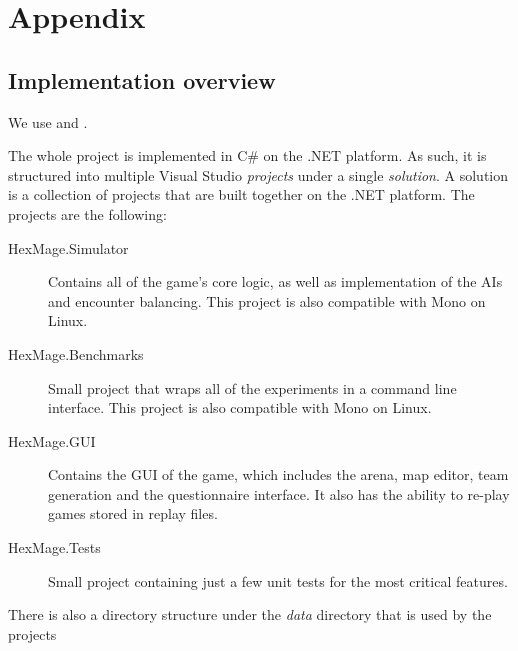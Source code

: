 \chapter{Appendix}
\label{appendix}

\section{Implementation overview}

We use \cite{libgdx} and \cite{json}.

The whole project is implemented in C\# on the .NET platform. As such, it is structured
into multiple Visual Studio \emph{projects} under a single \emph{solution}. A solution is a collection
of projects that are built together on the .NET platform. The projects are
the following:


\begin{description}
	\item[HexMage.Simulator] Contains all of the game's core logic, as well as implementation of the AIs
		and encounter balancing. This project is also compatible with Mono on Linux.
	\item[HexMage.Benchmarks] Small project that wraps all of the experiments in a command line interface.
		This project is also compatible with Mono on Linux.
	\item[HexMage.GUI] Contains the GUI of the game, which includes the arena, map editor, team generation
		and the questionnaire interface. It also has the ability to re-play games stored in replay files.
	\item[HexMage.Tests] Small project containing just a few unit tests for the most critical features.
\end{description}

There is also a directory structure under the \emph{data} directory that is used by the projects

